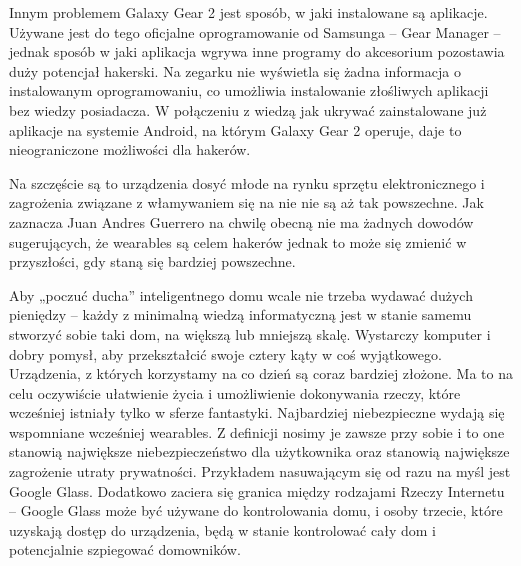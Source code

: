 \documentclass[brudnopis]{xmgr}
\begin{document}
Innym problemem Galaxy Gear 2 jest sposób, w jaki instalowane są aplikacje. Używane jest do tego oficjalne oprogramowanie od Samsunga – Gear Manager – jednak sposób w jaki aplikacja wgrywa inne programy do akcesorium pozostawia duży potencjał hakerski. Na zegarku nie wyświetla się żadna informacja o instalowanym oprogramowaniu, co umożliwia instalowanie złośliwych aplikacji bez wiedzy posiadacza. W połączeniu z wiedzą jak ukrywać zainstalowane już aplikacje na systemie Android, na którym Galaxy Gear 2 operuje, daje to nieograniczone możliwości dla hakerów.

Na szczęście są to urządzenia dosyć młode na rynku sprzętu elektronicznego i zagrożenia związane z włamywaniem się na nie nie są aż tak powszechne. Jak zaznacza Juan Andres Guerrero na chwilę obecną nie ma żadnych dowodów sugerujących, że wearables są celem hakerów jednak to może się zmienić w przyszłości, gdy staną się bardziej powszechne.

Aby „poczuć ducha” inteligentnego domu wcale nie trzeba wydawać dużych pieniędzy – każdy z minimalną wiedzą informatyczną jest w stanie samemu stworzyć sobie taki dom, na większą lub mniejszą skalę. Wystarczy komputer i dobry pomysł, aby przekształcić swoje cztery kąty w coś wyjątkowego.
Urządzenia, z których korzystamy na co dzień są coraz bardziej złożone. Ma to na celu oczywiście ułatwienie życia i umożliwienie dokonywania rzeczy, które wcześniej istniały tylko w sferze fantastyki.
Najbardziej niebezpieczne wydają się wspomniane wcześniej wearables. Z definicji nosimy je zawsze przy sobie i to one stanowią największe niebezpieczeństwo dla użytkownika oraz stanowią największe zagrożenie utraty prywatności. Przykładem nasuwającym się od razu na myśl jest Google Glass. Dodatkowo zaciera się granica między rodzajami Rzeczy Internetu – Google Glass może być używane do kontrolowania domu, i osoby trzecie, które uzyskają dostęp do urządzenia, będą w stanie kontrolować cały dom i potencjalnie  szpiegować domowników.~\cite{Kaspersky:2014:CMC}
\end{document}
